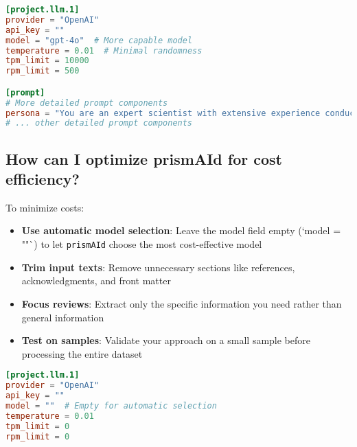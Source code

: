 \begin{configbox}
\begin{lstlisting}[language=TOML]
[project.llm.1]
provider = "OpenAI"
api_key = ""
model = "gpt-4o"  # More capable model
temperature = 0.01  # Minimal randomness
tpm_limit = 10000
rpm_limit = 500

[prompt]
# More detailed prompt components
persona = "You are an expert scientist with extensive experience conducting systematic reviews following PRISMA guidelines. You have specific expertise in identifying methodological details and extracting precise information from scientific papers."
# ... other detailed prompt components
\end{lstlisting}
\end{configbox}

\subsection{How can I optimize prismAId for cost efficiency?}

To minimize costs:

\begin{itemize}
    \item \textbf{Use automatic model selection}: Leave the model field empty (`model = ""`) to let \texttt{prismAId} choose the most cost-effective model
    \item \textbf{Trim input texts}: Remove unnecessary sections like references, acknowledgments, and front matter
    \item \textbf{Focus reviews}: Extract only the specific information you need rather than general information
    \item \textbf{Test on samples}: Validate your approach on a small sample before processing the entire dataset
\end{itemize}

\begin{configbox}
\begin{lstlisting}[language=TOML]
[project.llm.1]
provider = "OpenAI"
api_key = ""
model = ""  # Empty for automatic selection
temperature = 0.01
tpm_limit = 0
rpm_limit = 0
\end{lstlisting}
\end{configbox}


